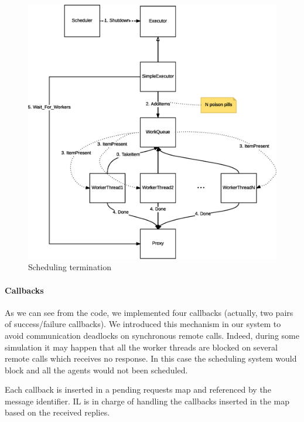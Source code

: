\begin{figure}[H]
\centering
\includegraphics[scale=0.5,keepaspectratio]{images/solution/app/backend/scheduling-termination.eps}
\caption{Scheduling termination}
\label{fig:schedule-termination}
\end{figure}

\paragraph{Callbacks}

As we can see from the code, we implemented four callbacks (actually, two
pairs of success/failure callbacks).
We introduced this mechanism in our system to avoid
communication deadlocks on synchronous remote calls.
Indeed, during some simulation it may happen
that all the worker threads are
blocked on several remote calls which receives no response.
In this case the scheduling system would block and all the agents would not
been scheduled.

Each callback is inserted in a pending requests map
and referenced by the message identifier.
IL is in charge of handling the callbacks inserted in the map based on the
received replies.
